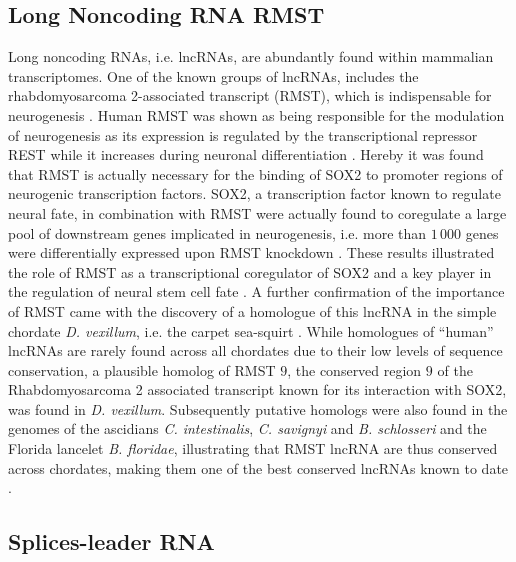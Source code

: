 \documentclass[graybox]{svmult}
\begin{document}
\subsection{Long Noncoding RNA RMST}

Long noncoding RNAs, i.e. lncRNAs, are abundantly found within mammalian 
transcriptomes. One of the known groups of lncRNAs, includes the 
rhabdomyosarcoma 2-associated transcript (RMST), which is indispensable for 
neurogenesis \cite{Bogu2013}. 
Human RMST was shown as being responsible for the modulation of neurogenesis as 
its expression is regulated by the transcriptional repressor REST while it 
increases during neuronal differentiation \cite{Bogu2013}. Hereby it was 
found that RMST is actually necessary for the binding of SOX2 to promoter 
regions of neurogenic transcription factors. SOX2, a transcription factor known 
to regulate neural fate, in combination with RMST were actually found to 
coregulate a large pool of downstream genes implicated in neurogenesis, i.e. 
more than $1\,000$ genes were differentially expressed upon RMST knockdown 
\cite{Bogu2013}. These results illustrated the role of RMST as a 
transcriptional coregulator of SOX2 and a key player in the regulation of 
neural stem cell fate \cite{Bogu2013}. A further confirmation of the importance 
of RMST came with the discovery of a homologue of this lncRNA in the simple 
chordate \textit{D. vexillum}, i.e. the carpet sea-squirt 
\cite{Velandia-Huerto2016}. While homologues of ``human'' lncRNAs are 
rarely found across all chordates due to their low levels of sequence 
conservation, a plausible homolog of RMST $9$, the conserved region $9$ of the 
Rhabdomyosarcoma 2 associated transcript known for its interaction with SOX2, 
was found in \textit{D. vexillum}. Subsequently putative homologs were also 
found in the genomes of the ascidians \textit{C. intestinalis}, \textit{C. 
savignyi} and \textit{B. schlosseri} and the Florida lancelet \textit{B. 
floridae}, illustrating that RMST lncRNA are thus conserved across chordates, 
making them one of the best conserved lncRNAs known to date 
\cite{Velandia-Huerto2016}.

\subsection{Splices-leader RNA}
\end{document}

